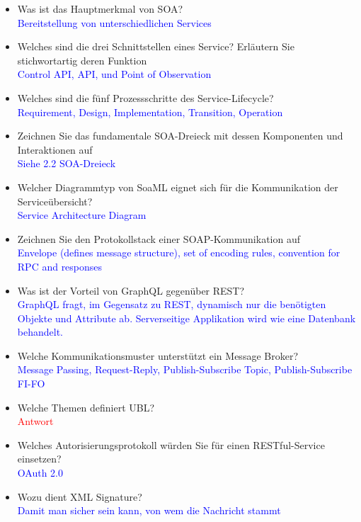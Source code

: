 \begin{itemize}
    \item Was ist das Hauptmerkmal von SOA? \\
    \textcolor{blue}{Bereitstellung von unterschiedlichen
    Services}
    \item Welches sind die drei Schnittstellen eines Service? Erläutern Sie stichwortartig deren Funktion \\
    \textcolor{blue}{Control API, API, und Point of Observation}
    \item Welches sind die fünf Prozessschritte des Service-Lifecycle? \\
    \textcolor{blue}{Requirement, Design, Implementation, Transition, Operation}
    \item Zeichnen Sie das fundamentale SOA-Dreieck mit dessen Komponenten und Interaktionen auf \\
    \textcolor{blue}{Siehe 2.2 SOA-Dreieck}
    \item Welcher Diagrammtyp von SoaML eignet sich für die Kommunikation der Serviceübersicht? \\
    \textcolor{blue}{Service Architecture Diagram}
    \item Zeichnen Sie den Protokollstack einer SOAP-Kommunikation auf \\
    \textcolor{blue}{Envelope (defines message structure), set of encoding rules,     convention for RPC and responses}
    \item Was ist der Vorteil von GraphQL gegenüber REST? \\
    \textcolor{blue}{GraphQL fragt, im Gegensatz zu REST, dynamisch nur die benötigten Objekte und Attribute ab. Serverseitige Applikation wird wie eine Datenbank behandelt.}
    \item Welche Kommunikationsmuster unterstützt ein Message Broker? \\
    \textcolor{blue}{Message Passing, Request-Reply, Publish-Subscribe Topic, Publish-Subscribe FI-FO}
    \item Welche Themen definiert UBL? \\
    \textcolor{red}{Antwort}
    \item Welches Autorisierungsprotokoll würden Sie für einen RESTful-Service einsetzen? \\
    \textcolor{blue}{OAuth 2.0}
    \item Wozu dient XML Signature? \\
    \textcolor{blue}{Damit man sicher sein kann, von wem die Nachricht stammt}
\end{itemize}

